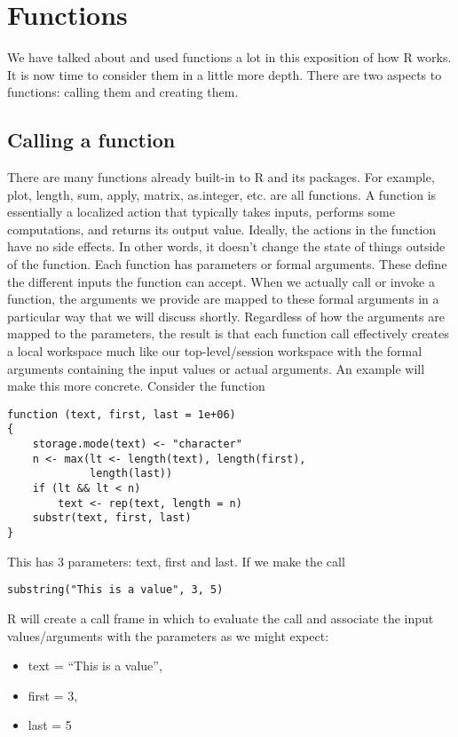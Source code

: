 \section{Functions}
We have talked about and used functions a lot in this exposition of
how R works. It is now time to consider them in a little more
depth. There are two aspects to functions: calling them and creating
them.

\subsection{Calling a function}
There are many functions already built-in to R and its packages. For
example, plot, length, sum, apply, matrix, as.integer, etc. are all
functions. A function is essentially a localized action that typically
takes inputs, performs some computations, and returns its output
value. Ideally, the actions in the function have no side effects. In
other words, it doesn't change the state of things outside of the
function. Each function has parameters or formal arguments. These
define the different inputs the function can accept. When we actually
call or invoke a function, the arguments we provide are mapped to
these formal arguments in a particular way that we will discuss
shortly. Regardless of how the arguments are mapped to the parameters,
the result is that each function call effectively creates a local
workspace much like our top-level/session workspace with the formal
arguments containing the input values or actual arguments. An example
will make this more concrete. Consider the function
\begin{verbatim}
function (text, first, last = 1e+06) 
{
    storage.mode(text) <- "character"
    n <- max(lt <- length(text), length(first), 
             length(last))
    if (lt && lt < n) 
        text <- rep(text, length = n)
    substr(text, first, last)
}
\end{verbatim}
This has 3 parameters: text, first and last. If we make the call
\begin{verbatim}
substring("This is a value", 3, 5)
\end{verbatim} 
R will create a call frame in which to evaluate the call and associate
the input values/arguments with the parameters as we might expect:
\begin{itemize}
\item text = ``This is a value'',

\item first = 3,

\item last = 5
\end{itemize}
